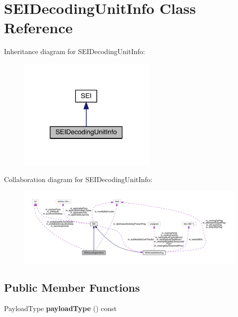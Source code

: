 \hypertarget{class_s_e_i_decoding_unit_info}{}\section{S\+E\+I\+Decoding\+Unit\+Info Class Reference}
\label{class_s_e_i_decoding_unit_info}


Inheritance diagram for S\+E\+I\+Decoding\+Unit\+Info\+:
\nopagebreak
\begin{figure}[H]
\begin{center}
\leavevmode
\includegraphics[width=189pt]{db/de6/class_s_e_i_decoding_unit_info__inherit__graph}
\end{center}
\end{figure}


Collaboration diagram for S\+E\+I\+Decoding\+Unit\+Info\+:
\nopagebreak
\begin{figure}[H]
\begin{center}
\leavevmode
\includegraphics[width=350pt]{d3/deb/class_s_e_i_decoding_unit_info__coll__graph}
\end{center}
\end{figure}
\subsection*{Public Member Functions}
\begin{DoxyCompactItemize}
\item 
\mbox{\label{class_s_e_i_decoding_unit_info_a852afec567f3613be47539ac925cb026}} 
Payload\+Type {\bfseries payload\+Type} () const
\end{DoxyCompactItemize}
